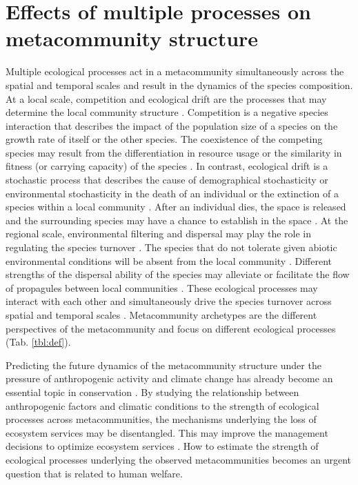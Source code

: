 	\section{Effects of multiple processes on metacommunity structure}
	\noindent
	Multiple ecological processes act in a metacommunity simultaneously across the spatial and temporal scales and result in the dynamics of the species composition. At a local scale, competition and ecological drift are the processes that may determine the local community structure \citep{leibold2004metacommunity}. Competition is a negative species interaction that describes the impact of the population size of a species on the growth rate of itself or the other species. The coexistence of the competing species may result from the differentiation in resource usage or the similarity in fitness (or carrying capacity) of the species \citep{macarthur1967limiting, chesson2000mechanisms}. In contrast, ecological drift is a stochastic process that describes the cause of demographical stochasticity or environmental stochasticity in the death of an individual or the extinction of a species within a local community \citep{hubbell2011unified}. After an individual dies, the space is released and the surrounding species may have a chance to establish in the space \citep{fukami2015historical}. At the regional scale, environmental filtering and dispersal may play the role in regulating the species turnover \citep{leibold2004metacommunity}. The species that do not tolerate given abiotic environmental conditions will be absent from the local community \citep{kraft2015community}. Different strengths of the dispersal ability of the species may alleviate or facilitate the flow of propagules between local communities \citep{tilman1997community, macarthur1967theory}. These ecological processes may interact with each other and simultaneously drive the species turnover across spatial and temporal scales \citep{thompson2020process}. Metacommunity archetypes are the different perspectives of the metacommunity and focus on different ecological processes \citep{leibold2004metacommunity, leibold2017metacommunity} (Tab. \ref{tbl:def}). 
	
	Predicting the future dynamics of the metacommunity structure under the pressure of anthropogenic activity and climate change has already become an essential topic in conservation \citep{clark2001ecological, evans2012modelling, chase2020biodiversity}. By studying the relationship between anthropogenic factors and climatic conditions to the strength of ecological processes across metacommunities, the mechanisms underlying the loss of ecosystem services may be disentangled. This may improve the management decisions to optimize ecosystem services \citep{hodgson2019investigating, chase2020biodiversity}. How to estimate the strength of ecological processes underlying the observed metacommunities becomes an urgent question that is related to human welfare.
	
